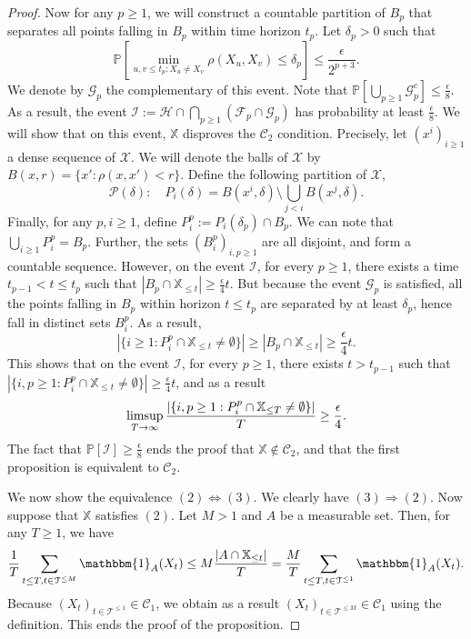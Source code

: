 \documentclass[aos]{imsart}
\theoremstyle{plain}
\theoremstyle{remark}
\newcommand{\Ccal}{\mathcal{C}}
\newcommand{\Fcal}{\mathcal{F}}
\newcommand{\Gcal}{\mathcal{G}}
\newcommand{\Hcal}{\mathcal{H}}
\newcommand{\Ical}{\mathcal{I}}
\newcommand{\Pcal}{\mathcal{P}}
\newcommand{\Tcal}{\mathcal{T}}
\newcommand{\Xcal}{\mathcal{X}}
\newcommand{\Pbb}{\mathbb{P}}
\newcommand{\Xbb}{\mathbb{X}}
\newcommand{\1}{\mathbbm{1}}%
\renewcommand{\limsup}{\mathop{\rm limsup}}
\begin{document}
\begin{proof}
Now for any $p\geq 1$, we will construct a countable partition of $B_p$ that separates all points falling in $B_p$ within time horizon $t_p$. Let $\delta_p>0$ such that
\begin{equation*}
    \Pbb\left[\min_{u,v\leq t_p: X_u\neq X_v} \rho(X_u,X_v) \leq  \delta_p \right] \leq \frac{\epsilon}{2^{p+3}}.
\end{equation*}
We denote by $\Gcal_p$ the complementary of this event. Note that $\Pbb[\bigcup_{p\geq 1} \Gcal_p^c] \leq \frac{\epsilon}{8}$. As a result, the event $\Ical:=\Hcal\cap\bigcap_{p\geq 1}(\Fcal_p\cap\Gcal_p)$ has probability at least $\frac{\epsilon}{8}$. We will show that on this event, $\Xbb$ disproves the $\Ccal_2$ condition. Precisely, let $(x^i)_{i\geq 1}$ a dense sequence of $\Xcal$. We will denote the balls of $\Xcal$ by $B(x,r) = \{x':\rho(x,x')<r\}$. Define the following partition of $\Xcal$,
\begin{equation*}
    \Pcal(\delta):\quad P_i(\delta) = B(x^i,\delta) \setminus \bigcup_{j<i} B(x^j,\delta).
\end{equation*}
Finally, for any $p, i\geq 1$, define $P^p_i:= P_i(\delta_p)\cap B_p.$ We can note that $\bigcup_{i\geq 1} P^p_i = B_p$. Further, the sets $(B^p_i)_{i,p\geq 1}$ are all disjoint, and form a countable sequence. However, on the event $\Ical$, for every $p\geq 1$, there exists a time $t_{p-1}<t\leq t_p$ such that $|B_p\cap\Xbb_{\leq t}|\geq \frac{\epsilon}{4}t$. But because the event $\Gcal_p$ is satisfied, all the points falling in $B_p$ within horizon $t\leq t_p$ are separated by at least $\delta_p$, hence fall in distinct sets $B^p_i$. As a result,
\begin{equation*}
    |\{i\geq 1: P^p_i\cap \Xbb_{\leq t}\neq\emptyset\}| \geq |B_p\cap\Xbb_{\leq t}|\geq \frac{\epsilon}{4}t.
\end{equation*}
This shows that on the event $\Ical$, for every $p\geq 1$, there exists $t>t_{p-1}$ such that $|\{i,p\geq 1: P^p_i\cap \Xbb_{\leq t}\neq\emptyset\}| \geq \frac{\epsilon}{4}t$, and as a result 
\begin{equation*}
\limsup_{T\to\infty} \frac{|\{i,p\geq 1: P^p_i\cap \Xbb_{\leq T}\neq\emptyset\}|}{T} \geq \frac{\epsilon}{4}.
\end{equation*}
The fact that $\Pbb[\Ical]\geq \frac{\epsilon}{8}$ ends the proof that $\Xbb\notin\Ccal_2$, and that the first proposition is equivalent to $\Ccal_2$.

We now show the equivalence $(2)\Leftrightarrow(3)$. We clearly have $(3)\Rightarrow(2)$. Now suppose that $\Xbb$ satisfies $(2)$. Let $M>1$ and $A$ be a measurable set. Then, for any $T\geq 1$, we have
\begin{equation*}
    \frac{1}{T} \sum_{t\leq T,t\in\Tcal^{\leq M}} \1_A(X_t) \leq M\frac{|A\cap\Xbb_{\leq t}|}{T} = \frac{M}{T} \sum_{t\leq T,t\in\Tcal^{\leq 1}} \1_A(X_t).
\end{equation*}
Because $(X_t)_{t\in\Tcal^{\leq 1}}\in\Ccal_1$, we obtain as a result $(X_t)_{t\in\Tcal^{\leq M}}\in\Ccal_1$ using the definition. This ends the proof of the proposition.
\end{proof}
\end{document}
